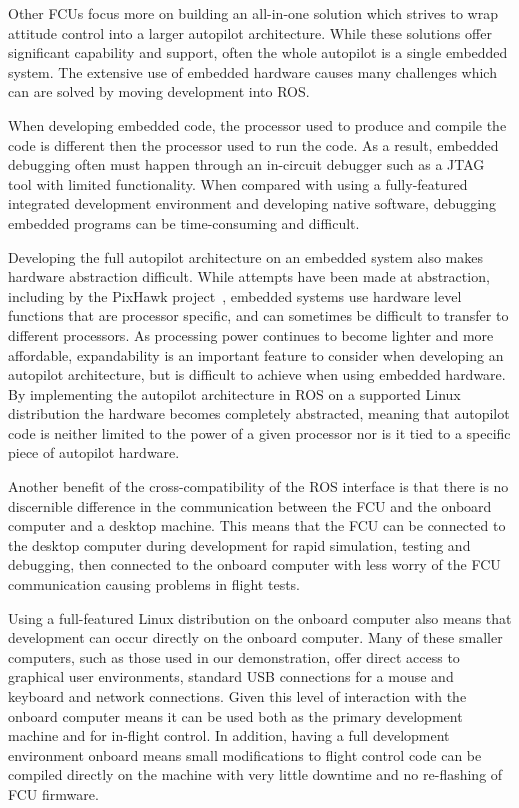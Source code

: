 \documentclass[letterpaper, 10 pt, conference]{ieeeconf}  %
\begin{document}
Other FCUs focus more on building an all-in-one solution which strives to wrap attitude control into a larger autopilot architecture.  While these solutions offer significant capability and support, often the whole autopilot is a single embedded system.  The extensive use of embedded hardware causes many challenges which can are solved by moving development into ROS.

When developing embedded code, the processor used to produce and compile the code is different then the processor used to run the code.  As a result, embedded debugging often must happen through an in-circuit debugger such as a JTAG tool with limited functionality.  When compared with using a fully-featured integrated development environment and developing native software, debugging embedded programs can be time-consuming and difficult.

Developing the full autopilot architecture on an embedded system also makes hardware abstraction difficult.  While attempts have been made at abstraction, including by the PixHawk project~\cite{Meier2015}, embedded systems use hardware level functions that are processor specific, and can sometimes be difficult to transfer to different processors.  As processing power continues to become lighter and more affordable, expandability is an important feature to consider when developing an autopilot architecture, but is difficult to achieve when using embedded hardware.  By implementing the autopilot architecture in ROS on a supported Linux distribution the hardware becomes completely abstracted, meaning that autopilot code is neither limited to the power of a given processor nor is it tied to a specific piece of autopilot hardware.

Another benefit of the cross-compatibility of the ROS interface is that there is no discernible difference in the communication between the FCU and the onboard computer and a desktop machine.  This means that the FCU can be connected to the desktop computer during development for rapid simulation, testing and debugging, then connected to the onboard computer with less worry of the FCU communication causing problems in flight tests.

Using a full-featured Linux distribution on the onboard computer also means that development can occur directly on the onboard computer.  Many of these smaller computers, such as those used in our demonstration, offer direct access to graphical user environments, standard USB connections for a mouse and keyboard and network connections.  Given this level of interaction with the onboard computer means it can be used both as the primary development machine and for in-flight control.  In addition, having a full development environment onboard means small modifications to flight control code can be compiled directly on the machine with very little downtime and no re-flashing of FCU firmware.
\end{document}
